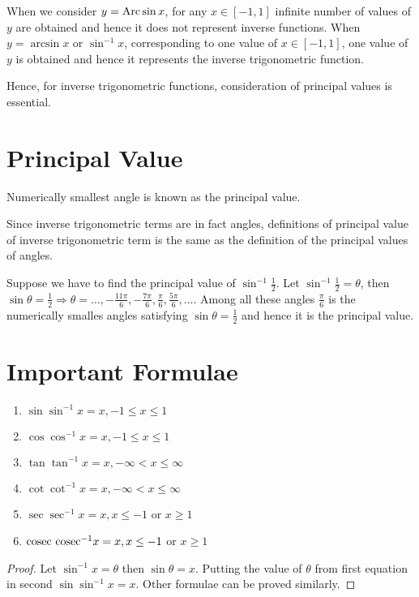 When we consider $y = {\rm Arc}\sin x$, for any $x\in[-1, 1]$ infinite number of values of $y$ are obtained and hence it does not
represent inverse functions. When $y = \arcsin x$ or $\sin^{-1}x$, corresponding to one value of $x\in[-1, 1]$, one value of $y$ is
obtained and hence it represents the inverse trigonometric function.

Hence, for inverse trigonometric functions, consideration of principal values is essential.

\section{Principal Value}
Numerically smallest angle is known as the principal value.

Since inverse trigonometric terms are in fact angles, definitions of principal value of inverse trigonometric term is the same as
the definition of the principal values of angles.

Suppose we have to find the principal value of $\sin^{-1}\frac{1}{2}$. Let $\sin^{-1}\frac{1}{2} = \theta$, then $\sin\theta =
\frac{1}{2} \Rightarrow \theta = \ldots, -\frac{11\pi}{6}, -\frac{7\pi}{6}, \frac{\pi}{6}, \frac{5\pi}{6}, \ldots$. Among all these
angles $\frac{\pi}{6}$ is the numerically smalles angles satisfying $\sin\theta = \frac{1}{2}$ and hence it is the principal value.

\section{Important Formulae}
\begin{theorem}
  \begin{enumerate}
  \item $\sin\sin^{-1}x = x, -1\leq x\leq 1$
  \item $\cos\cos^{-1}x = x, -1\leq x\leq 1$
  \item $\tan\tan^{-1}x = x, -\infty < x\leq\infty$
  \item $\cot\cot^{-1}x = x, -\infty < x\leq\infty$
  \item $\sec\sec^{-1}x = x, x\leq -1$ or $x\geq 1$
  \item ${\rm cosec~cosec}^{-1}x = x, x\leq -1$ or $x\geq 1$
  \end{enumerate}
\end{theorem}

\begin{proof}
Let $\sin^{-1}x = \theta$ then $\sin\theta = x$. Putting the value of $\theta$ from first equation in second
$\sin\sin^{-1}x = x$. Other formulae can be proved similarly.
\end{proof}

